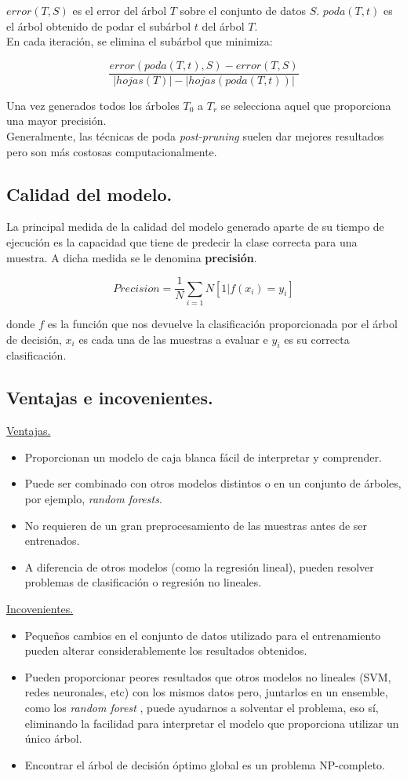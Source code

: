 $error(T, S)$ es el error del árbol $T$ sobre el conjunto de datos $S$. $poda(T, t)$ es el árbol obtenido de podar el subárbol $t$ del árbol $T$.\\

En cada iteración, se elimina el subárbol que minimiza:

$$
\frac{error(poda(T, t), S) - error(T, S)}{|hojas(T)| - |hojas(poda(T, t))|}
$$

Una vez generados todos los árboles $T_0$ a $T_r$ se selecciona aquel que proporciona una mayor precisión.\\

Generalmente, las técnicas de poda \textit{post-pruning} suelen dar mejores resultados pero son más costosas computacionalmente.
\subsection{Calidad del modelo.}
La principal medida de la calidad del modelo generado aparte de su tiempo de ejecución es la capacidad que tiene de predecir la clase correcta para una muestra. A dicha medida se le denomina \textbf{precisión}.

$$
Precision = \frac{1}{N}\sum_{i=1}{N}[1|f(x_i) = y_i]
$$

donde $f$ es la función que nos devuelve la clasificación proporcionada por el árbol de decisión, $x_i$ es cada una de las muestras a evaluar e $y_i$ es su correcta clasificación.

\subsection{Ventajas e incovenientes.}
\underline{Ventajas.}
\begin{itemize}
	\item Proporcionan un modelo de caja blanca fácil de interpretar y comprender.
	\item Puede ser combinado con otros modelos distintos o en un conjunto de árboles, por ejemplo, \textit{random forests}.
	\item No requieren de un gran preprocesamiento de las muestras antes de ser entrenados.
	\item A diferencia de otros modelos (como la regresión lineal), pueden resolver problemas de clasificación o regresión no lineales.\\
\end{itemize}

\underline{Incovenientes.}
\begin{itemize}
	\item Pequeños cambios en el conjunto de datos utilizado para el entrenamiento pueden alterar considerablemente los resultados obtenidos.
	\item Pueden proporcionar peores resultados que otros modelos no lineales (SVM, redes neuronales, etc) con los mismos datos pero, juntarlos en un ensemble, como los \textit{random forest} \cite{randomforest}, puede ayudarnos a solventar el problema, eso sí, eliminando la facilidad para interpretar el modelo que proporciona utilizar un único árbol.
	\item Encontrar el árbol de decisión óptimo global es un problema NP-completo.
\end{itemize}
